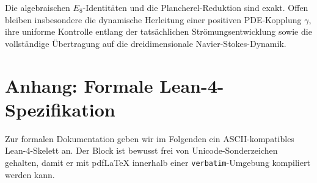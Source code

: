 \documentclass[11pt,twoside,a4paper]{article}
\begin{document}
	Die algebraischen $E_8$-Identitäten und die Plancherel-Reduktion sind exakt. Offen bleiben insbesondere die dynamische Herleitung einer positiven PDE-Kopplung $\gamma$, ihre uniforme Kontrolle entlang der tatsächlichen Strömungsentwicklung sowie die vollständige Übertragung auf die dreidimensionale Navier-Stokes-Dynamik.
	
	\appendix
	
	\section{Anhang: Formale Lean-4-Spezifikation}
	\label{sec:appendix_lean_formal}
	
	Zur formalen Dokumentation geben wir im Folgenden ein ASCII-kompatibles Lean-4-Skelett an. Der Block ist bewusst frei von Unicode-Sonderzeichen gehalten, damit er mit pdfLaTeX innerhalb einer \texttt{verbatim}-Umgebung kompiliert werden kann.
	
\end{document}
